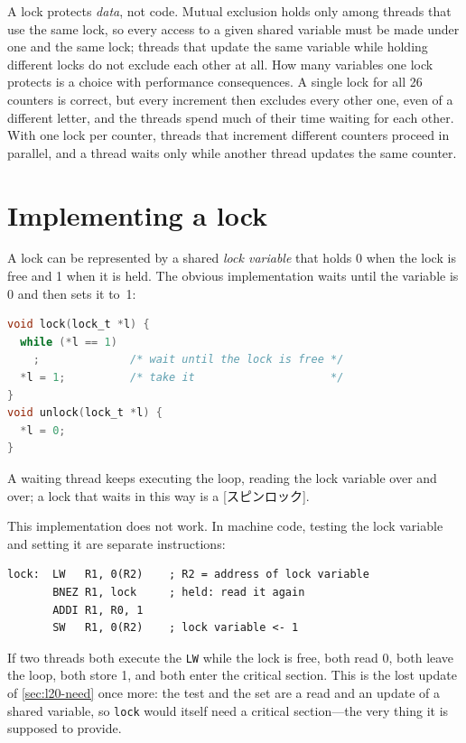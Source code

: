 \documentclass[../main.tex]{subfiles}
\begin{document}
A lock protects \emph{data}, not code.  Mutual exclusion holds only among
threads that use the same lock, so every access to a given shared variable
must be made under one and the same lock; threads that update the same
variable while holding different locks do not exclude each other at all.
How many variables one lock protects is a choice with performance
consequences.  A single lock for
all 26 counters is correct, but every increment then excludes every other
one, even of a different letter, and the threads spend much of their time
waiting for each other.  With one lock per counter, threads that increment
different counters proceed in parallel, and a thread waits only while
another thread updates the same counter.

\section{Implementing a lock}
\label{sec:l20-implementing}

A lock can be represented by a shared \emph{lock variable} that holds 0 when
the lock is free and 1 when it is held.  The obvious implementation waits until the
variable is 0 and then sets it to~1:
\begin{lstlisting}[language=C, numbers=none]
void lock(lock_t *l) {
  while (*l == 1)
    ;              /* wait until the lock is free */
  *l = 1;          /* take it                     */
}
void unlock(lock_t *l) {
  *l = 0;
}
\end{lstlisting}
A waiting thread keeps executing the loop, reading the lock variable over
and over; a lock that waits in this way is a [スピンロック].

This implementation does not work.  In machine code, testing the lock
variable and setting it are separate instructions:
\begin{lstlisting}[language={[x86masm]Assembler}, numbers=none, deletekeywords={lock}]
lock:  LW   R1, 0(R2)    ; R2 = address of lock variable
       BNEZ R1, lock     ; held: read it again
       ADDI R1, R0, 1
       SW   R1, 0(R2)    ; lock variable <- 1
\end{lstlisting}
If two threads both execute the \texttt{LW} while the lock is free, both read
0, both leave the loop, both store 1, and both enter the critical
section.
This is the lost update of \cref{sec:l20-need} once more: the test and the
set are a read and an update of a shared variable, so \texttt{lock} would
itself need a critical section---the very thing it is supposed to provide.
\end{document}
